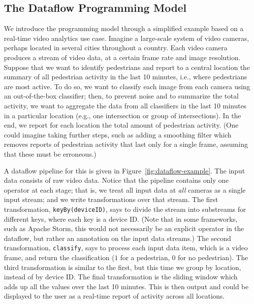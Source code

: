 \subsection{The Dataflow Programming Model}

We introduce the programming model through a simplified example based on a real-time video analytics use case.
Imagine a large-scale system of video cameras, perhaps located in several cities throughout a country. Each video camera produces a stream of video data, at a certain frame rate and image resolution. Suppose that we want to identify pedestrians and report to a central location the summary of all pedestrian activity in the last 10 minutes, i.e., where pedestrians are most active. To do so, we want to classify each image from each camera using an out-of-the-box classifier; then, to prevent noise and to summarize the total activity, we want to aggregate the data from all classifiers in the last 10 minutes in a particular location (e.g., one intersection or group of intersections). In the end, we report for each location the total amount of pedestrian activity. (One could imagine taking further steps, such as adding a smoothing filter which removes reports of pedestrian activity that last only for a single frame, assuming that these must be erroneous.)

A dataflow pipeline for this is given in Figure~\ref{fig:dataflow-example}. The input data consists of raw video data. Notice that the pipeline contains only one operator at each stage; that is, we treat all input data at \emph{all} cameras as a single input stream; and we write transformations over that stream. The first transformation, \texttt{keyBy(deviceID)}, says to divide the stream into substreams for different keys, where each key is a device ID. (Note that in some frameworks, such as Apache Storm, this would not necessarily be an explicit operator in the dataflow, but rather an annotation on the input data streams.) The second transformation, \texttt{classify}, says to process each input data item, which is a video frame, and return the classification ($1$ for a pedestrian, $0$ for no pedestrian). The third transformation is similar to the first, but this time we group by location, instead of by device ID. The final transformation is the sliding window which adds up all the values over the last 10 minutes. This is then output and could be displayed to the user as a real-time report of activity across all locations.

